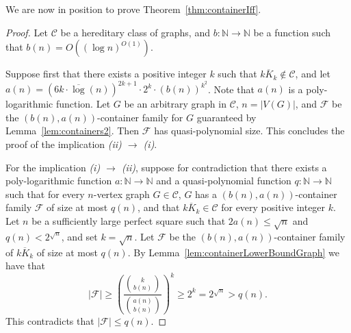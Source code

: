 \documentclass[11pt]{amsart}
\newcommand{\cal}{\mathcal}
\begin{document}
We are now in position to prove Theorem~\ref{thm:containerIff}.

\MainThmContainer*
\begin{proof}
    Let ${\cal C}$ be a hereditary class of graphs, and $b : \mathbb{N} \rightarrow \mathbb{N}$ be a function such that $b(n) = O((\log n)^{O(1)})$.
    
    Suppose first that there exists a positive integer $k$ such that  $\overline{kK_k} \notin {\cal C}$, and let
    $a(n) = (6k\cdot \overline{\log}(n))^{2k+1}\cdot 2^k \cdot (b(n))^{k^2}$. Note that $a(n)$ is a poly-logarithmic function.
    Let $G$ be an arbitrary graph in ${\cal C}$, $n = |V(G)|$, and ${\cal F}$ be the $(b(n), a(n))$-container family for $G$ guaranteed by Lemma~\ref{lem:containers2}. Then ${\cal F}$ has quasi-polynomial size. This concludes the proof of the implication {\em (ii) $\rightarrow$ (i)}.
    
    For the implication {\em (i) $\rightarrow$ (ii)}, suppose for contradiction that there exists a poly-logarithmic function $a : \mathbb{N} \rightarrow \mathbb{N}$ and a quasi-polynomial function $q : \mathbb{N} \rightarrow \mathbb{N}$ such that for every $n$-vertex graph $G \in {\cal C}$, $G$ has a $(b(n), a(n))$-container family ${\cal F}$ of size at most $q(n)$, and that $\overline{kK_k} \in {\cal C}$ for every positive integer $k$.
    Let $n$ be a sufficiently large perfect square such that $2a(n) \leq \sqrt{n}$ and $q(n) < 2^{\sqrt{n}}$, and set $k = \sqrt{n}$.
    Let ${\cal F}$ be the $(b(n), a(n))$-container family of $\overline{kK_k}$ of size at most $q(n)$.
    By Lemma~\ref{lem:containerLowerBoundGraph} we have that 
    $$|{\cal F}| \geq \left(\frac{{k \choose b(n)}}{{a(n) \choose b(n)}}\right)^k \geq 2^k = 2^{\sqrt{n}} > q(n).$$
    This contradicts that $|{\cal F}| \leq q(n)$.
\end{proof}





%
%
\end{document}
